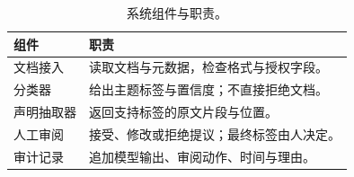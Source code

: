 \begin{table}[htbp]
  \centering
  \formaltable
  \begin{tabularx}{\textwidth}{|B|Y|}
    \hline
    \textbf{组件} & \textbf{职责} \\ \hline
    文档接入 & 读取文档与元数据，检查格式与授权字段。 \\ \hline
    分类器 & 给出主题标签与置信度；不直接拒绝文档。 \\ \hline
    声明抽取器 & 返回支持标签的原文片段与位置。 \\ \hline
    人工审阅 & 接受、修改或拒绝提议；最终标签由人决定。 \\ \hline
    审计记录 & 追加模型输出、审阅动作、时间与理由。 \\ \hline
  \end{tabularx}
  \caption{系统组件与职责。}
  \label{tab:components}
\end{table}
